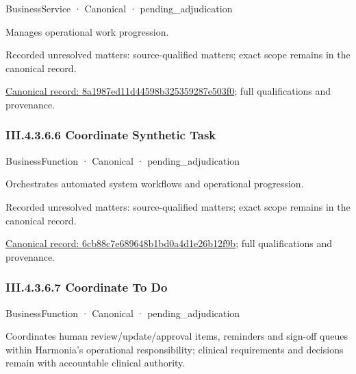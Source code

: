 \label{element:8a1987ed11d44598b325359287e503f0}
{\small BusinessService · Canonical · pending\_adjudication}\par

Manages operational work progression.


{\small Recorded unresolved matters: source-qualified matters; exact scope remains in the canonical record.}\par
{\footnotesize \href{../../../../../../../../continuum/business/business-service/8a1987ed11d44598b325359287e503f0.md}{Canonical record: 8a1987ed11d44598b325359287e503f0}; full qualifications and provenance.}\par
\subsubsection*{III.4.3.6.6 Coordinate Synthetic Task}
\label{navigation:III.4.3.6.6}

\label{element:6cb88c7e689648b1bd0a4d1e26b12f9b}
{\small BusinessFunction · Canonical · pending\_adjudication}\par

Orchestrates automated system workflows and operational progression.


{\small Recorded unresolved matters: source-qualified matters; exact scope remains in the canonical record.}\par
{\footnotesize \href{../../../../../../../../continuum/business/business-function/6cb88c7e689648b1bd0a4d1e26b12f9b.md}{Canonical record: 6cb88c7e689648b1bd0a4d1e26b12f9b}; full qualifications and provenance.}\par
\subsubsection*{III.4.3.6.7 Coordinate To Do}
\label{navigation:III.4.3.6.7}

\label{element:a4c9a281578d493eb876eda9fb73cac1}
{\small BusinessFunction · Canonical · pending\_adjudication}\par

Coordinates human review/update/approval items, reminders and sign-off queues within Harmonia's operational responsibility; clinical requirements and decisions remain with accountable clinical authority.


